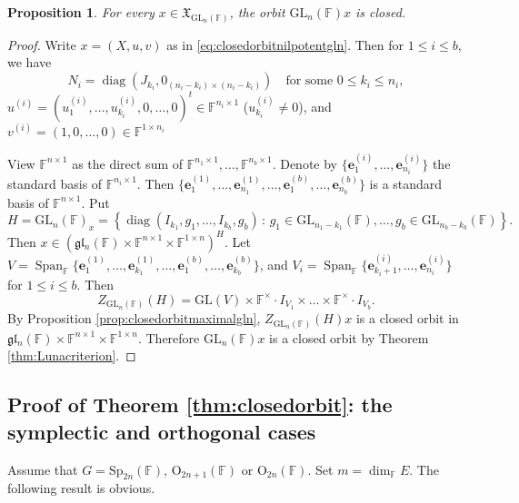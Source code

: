 \documentclass[12pt]{amsart}
\newtheorem{prop}[lm]{Proposition}
\theoremstyle{definition}
\theoremstyle{remark}\newtheorem{rmk}[lm]{Remark}
\newcommand{\RO}{{\mathrm {O}}}
\newcommand{\GL}{{\mathrm{GL}}}
\newcommand{\Sp}{{\mathrm{Sp}}}
\newcommand{\diag}{\operatorname{diag}}
\newcommand{\Span}{\operatorname{Span}}
\newcommand{\gl}{\mathfrak g \mathfrak l}
\newcommand{\fX}{\mathfrak X}
\newcommand{\C}{\mathbb{F}}
\newcommand{\be}{\mathbf{e}}
\renewcommand{\mid}{\,:\,}
\begin{document}
	\begin{prop}
		\label{prop:closedgln}
		For every $x\in\fX_{\GL_n(\C)}$, the orbit $\GL_n(\C)x$ is closed.
	\end{prop}
	\begin{proof}
        Write $x=(X,u,v)$ as in \eqref{eq:closedorbitnilpotentgln}. Then for $1\leq i\leq b$, we have
        \begin{equation*}
			N_i=\diag(
				J_{k_i},0_{(n_i-k_i)\times(n_i-k_i)})\quad\text{for some }0\leq k_i\leq n_i,
        \end{equation*}
        $u^{(i)}=(u_1^{(i)},\dots,u_{k_i}^{(i)},0,\dots,0)^t\in\C^{n_i\times 1}$ ($u_{k_i}^{(i)}\neq 0$), and $v^{(i)}=(1,0,\dots,0)\in\C^{1\times n_i}$
    
		View $\C^{n\times 1}$ as the direct sum of $\C^{n_1\times 1},\dots,\C^{n_b\times 1}$. Denote by $\{\be_1^{(i)},\dots,\be_{n_i}^{(i)}\}$ the standard basis of $\C^{n_i\times 1}$. Then $\{\be_1^{(1)},\dots,\be_{n_1}^{(1)},\dots,\be_1^{(b)},\dots,\be_{n_b}^{(b)}\}$ is a standard basis of $\C^{n\times 1}$. Put
		\begin{equation*}
			H=\GL_n(\C)_x=\left\{\diag(I_{k_1},g_1,\dots,I_{k_b},g_b)\mid g_1\in\GL_{n_1-k_1}(\C),\dots,g_b\in\GL_{n_b-k_b}(\C)\right\}.
		\end{equation*}
		Then $x\in (\gl_n(\C)\times\C^{n\times 1}\times\C^{1\times n})^H$. Let $V=\Span_{\C}\{\be_1^{(1)},\dots,\be_{k_1}^{(1)},\dots,\be_1^{(b)},\dots,\be_{k_b}^{(b)}\}$, and $V_i=\Span_{\C}\{\be_{k_i+1}^{(i)},\dots,\be_{n_i}^{(i)}\}$ for $1\leq i\leq b$. Then
		\begin{equation*}
			Z_{\GL_n(\C)}(H)=\GL(V)\times\C^{\times}\cdot I_{V_1}\times\dots\times\C^{\times}\cdot I_{V_b}.
		\end{equation*}
		By Proposition \ref{prop:closedorbitmaximalgln}, $Z_{\GL_n(\C)}(H)x$ is a closed orbit in $\gl_n(\C)\times\C^{n\times 1}\times\C^{1\times n}$. Therefore $\GL_n(\C)x$ is a closed orbit by Theorem \ref{thm:Lunacriterion}.
	\end{proof}
	\subsection{Proof of Theorem \ref{thm:closedorbit}: the symplectic and orthogonal cases}
	Assume that $G=\Sp_{2n}(\C)$, $\RO_{2n+1}(\C)$ or $\RO_{2n}(\C)$. Set $m=\dim_{\C}E$. The following result is obvious.
	
\end{document}
